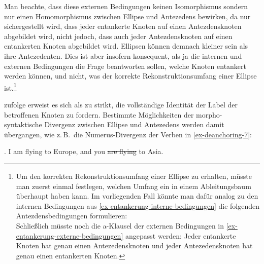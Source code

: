 Man beachte, dass diese externen Bedingungen keinen Isomorphismus sondern nur einen Homomorphismus zwischen Ellipse und Antezedens bewirken, da nur sichergestellt wird, dass jeder entankerte Knoten auf einen Antezdensknoten abgebildet wird, nicht jedoch, dass auch jeder Antezdensknoten auf einen entankerten Knoten abgebildet wird. Ellipsen können demnach kleiner sein als ihre Antezedenten. Dies ist aber insofern konsequent, als ja die internen und externen Bedingungen die Frage beantworten sollen, welche Knoten entankert werden können, und  nicht, was der korrekte Rekonstruktionsumfang einer Ellipse ist.\footnote{Um den korrekten Rekonstruktionsumfang einer Ellipse zu erhalten, müsste man zuerst einmal festlegen, welchen Umfang ein  in einem Ableitungsbaum überhaupt haben kann. Im vorliegenden Fall könnte man dafür analog zu den internen Bedingungen aus \ref{ex-entankerung-interne-bedingungen} die folgenden Antezdensbedingungen formulieren:\\
Schlie\ss lich müsste noch die a-Klausel der externen Bedingungen in \ref{ex-entankerung-externe-bedingungen} angepasst werden: Jeder entankerte Knoten hat genau einen Antezedensknoten und jeder Antezedensknoten hat genau einen entankerten Knoten.} 

\cite{Lichte:Kallmeyer:10} zufolge erweist es sich als zu strikt, die vollständige Identität der Label der betroffenen Knoten zu fordern. Bestimmte Möglichkeiten der morpho-syntaktische Divergenz zwischen Ellipse und Antezedens werden damit übergangen, wie z.\,B.\ die Numerus-Divergenz der Verben in \ref{ex-deanchoring-7}:  

\ex. \label{ex-deanchoring-7} I am flying to Europe, and you \sout{are flying} to Asia. \hfill \citep[(4)]{Osborne:08}

